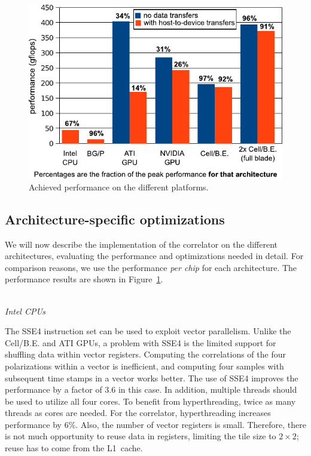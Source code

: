 \documentclass{article}
\begin{document}
\begin{figure}[t]
\begin{center}
\includegraphics[width=0.8\columnwidth]{figures/performance-graph-v2.pdf}
\end{center}
\vspace{-0.5cm}
\caption{Achieved performance on the different platforms.}
\label{performance-graph}
\end{figure}



\subsection{Architecture-specific optimizations}
\label{sec:architecture-optimizations}

We will now describe the implementation of the correlator on
the different architectures, evaluating the performance and optimizations needed in detail. 
For comparison reasons, we use the performance
\emph{per chip} for each architecture.
The performance results are shown in Figure~\ref{performance-graph}.


\noindent \\ \emph{Intel CPUs}

\noindent The SSE4 instruction set can be used to exploit vector parallelism.  
Unlike the \mbox{Cell/B.E.} and ATI GPUs, a
problem with SSE4 is the limited support for shuffling data within
vector registers.  Computing the
correlations of the four polarizations within a vector is
inefficient, and computing four samples with subsequent time stamps in a vector works
better. 
The use of SSE4 improves the performance by a factor of 3.6
in this case.  In addition, multiple threads should be used to utilize all
four cores.  To benefit from hyperthreading, twice as many
threads as cores are needed.  For the correlator, hyperthreading increases performance by 6\%. 
Also, the number of vector registers is small.
Therefore, there is not much opportunity to reuse data in registers,
limiting the tile size to $2 \times 2$; reuse has to come from the
L1~cache.
\end{document}
